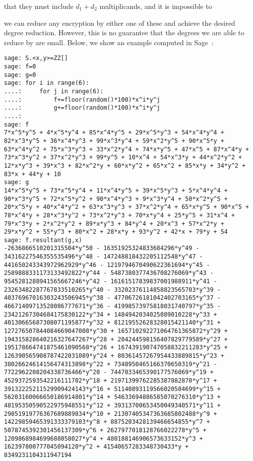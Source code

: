 \documentclass[11pt]{report}
\begin{document}
that they must include $d_1+d_2$ multiplicands, and it is impossible to 


 we can reduce any encryption by either one of these and achieve the desired degree reduction. However, this is no guarantee that the degrees we are able to reduce by are small. Below, we show an example computed in Sage~\cite{sage}:
\begin{verbatim}
sage: S.<x,y>=ZZ[]
sage: f=0
sage: g=0
sage: for i in range(6):
....:     for j in range(6):
....:         f+=floor(random()*100)*x^i*y^j
....:         g+=floor(random()*100)*x^i*y^j
....:         
sage: f
7*x^5*y^5 + 4*x^5*y^4 + 85*x^4*y^5 + 29*x^5*y^3 + 54*x^4*y^4 + 82*x^3*y^5 + 36*x^4*y^3 + 99*x^3*y^4 + 59*x^2*y^5 + 90*x^5*y + 63*x^4*y^2 + 75*x^3*y^3 + 33*x^2*y^4 + 74*x*y^5 + 47*x^5 + 87*x^4*y + 73*x^3*y^2 + 37*x^2*y^3 + 99*y^5 + 10*x^4 + 54*x^3*y + 44*x^2*y^2 + 12*x*y^3 + 39*x^3 + 82*x^2*y + 60*x*y^2 + 65*x^2 + 85*x*y + 34*y^2 + 83*x + 44*y + 10
sage: g
14*x^5*y^5 + 73*x^5*y^4 + 11*x^4*y^5 + 39*x^5*y^3 + 5*x^4*y^4 + 90*x^3*y^5 + 72*x^5*y^2 + 90*x^4*y^3 + 9*x^3*y^4 + 50*x^2*y^5 + 20*x^5*y + 40*x^4*y^2 + 63*x^3*y^3 + 37*x^2*y^4 + 65*x*y^5 + 90*x^5 + 78*x^4*y + 28*x^3*y^2 + 73*x^2*y^3 + 70*x*y^4 + 25*y^5 + 31*x^4 + 79*x^3*y + 2*x^2*y^2 + 89*x*y^3 + 84*y^4 + 20*x^3 + 57*x^2*y + 29*x*y^2 + 55*y^3 + 80*x^2 + 28*x*y + 93*y^2 + 42*x + 79*y + 54
sage: f.resultant(g,x)
-2636866510201315504*y^50 - 16351925324833684296*y^49 - 34316227546355535496*y^48 - 147248818432205112548*y^47 - 441650243343972962929*y^46 - 1219794670490622361694*y^45 - 2589888331173133492822*y^44 - 5487380377436708276069*y^43 - 9545281288941565667246*y^42 - 16161517839837001988911*y^41 - 23263482287767833510265*y^40 - 33202376114858823565703*y^39 - 40376967016303243506945*y^38 - 47706726181042402703165*y^37 - 46671409713528086777671*y^36 - 41998573975818031740797*y^35 - 23421267304684175830122*y^34 + 1484942034025089010228*y^33 + 40130665687308071195877*y^32 + 81219552628328015421140*y^31 + 127276507844084669047008*y^30 + 165710292271064761365872*y^29 + 194315828640216327647267*y^28 + 204244598156407829779589*y^27 + 195178664741875461090568*y^26 + 167439190747058832211283*y^25 + 126390565908787422031089*y^24 + 80361457267954433889815*y^23 + 38026624614156474313898*y^22 + 7348950465166370650319*y^21 - 7722962208204338736466*y^20 - 7447033465390177576069*y^19 + 4529372593542216111702*y^18 + 21971399762285387882870*y^17 + 39132225211529909424143*y^16 + 51140893119566020504699*y^15 + 56203160066650186914801*y^14 + 54633694886585070276310*y^13 + 48195350590522975948551*y^12 + 39313700653450049340571*y^11 + 29851919776367689889834*y^10 + 21307405347363685802488*y^9 + 14229859465391333379103*y^8 + 8875203428139466654855*y^7 + 5078745392301456137309*y^6 + 2627977018128766022278*y^5 + 1209868984699688058027*y^4 + 480188146906573633152*y^3 + 162397800777045094120*y^2 + 41540657283348730433*y + 8349231104311947194

\end{verbatim}
\end{document}
